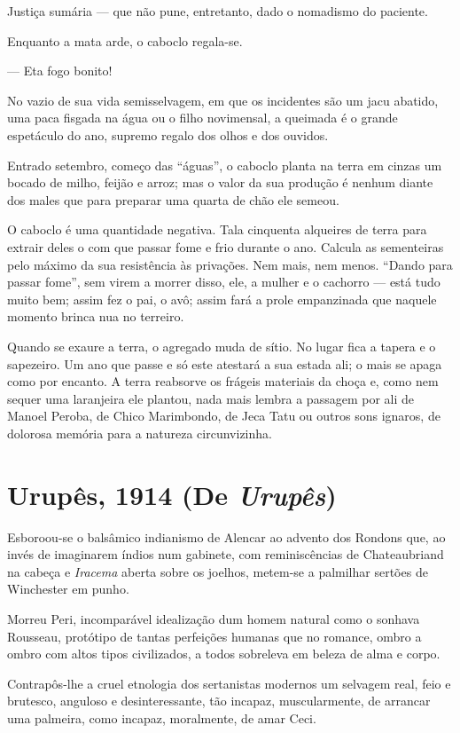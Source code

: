 Justiça sumária --- que não pune, entretanto, dado o nomadismo do
paciente.

Enquanto a mata arde, o caboclo regala-se.

--- Eta fogo bonito!

No vazio de sua vida semisselvagem, em que os incidentes são um jacu
abatido, uma paca fisgada na água ou o filho novimensal, a queimada é o
grande espetáculo do ano, supremo regalo dos olhos e dos ouvidos.

Entrado setembro, começo das ``águas'', o caboclo planta na terra em
cinzas um bocado de milho, feijão e arroz; mas o valor da sua produção é
nenhum diante dos males que para preparar uma quarta de chão ele semeou.

O caboclo é uma quantidade negativa. Tala cinquenta alqueires de terra
para extrair deles o com que passar fome e frio durante o ano. Calcula
as sementeiras pelo máximo da sua resistência às privações. Nem mais,
nem menos. ``Dando para passar fome'', sem virem a morrer disso, ele, a
mulher e o cachorro --- está tudo muito bem; assim fez o pai, o avô;
assim fará a prole empanzinada que naquele momento brinca nua no
terreiro.

Quando se exaure a terra, o agregado muda de sítio. No lugar fica a
tapera e o sapezeiro. Um ano que passe e só este atestará a sua estada
ali; o mais se apaga como por encanto. A terra reabsorve os frágeis
materiais da choça e, como nem sequer uma laranjeira ele plantou, nada
mais lembra a passagem por ali de Manoel Peroba, de Chico Marimbondo, de
Jeca Tatu ou outros sons ignaros, de dolorosa memória para a natureza
circunvizinha.

\chapter{Urupês, 1914 (De \emph{Urupês})}

Esboroou-se o balsâmico indianismo de Alencar ao advento dos Rondons
que, ao invés de imaginarem índios num gabinete, com reminiscências de
Chateaubriand na cabeça e \emph{Iracema} aberta sobre os joelhos,
metem-se a palmilhar sertões de Winchester em punho.

Morreu Peri, incomparável idealização dum homem natural como o sonhava
Rousseau, protótipo de tantas perfeições humanas que no romance, ombro a
ombro com altos tipos civilizados, a todos sobreleva em beleza de alma e
corpo.

Contrapôs-lhe a cruel etnologia dos sertanistas modernos um selvagem
real, feio e brutesco, anguloso e desinteressante, tão incapaz,
muscularmente, de arrancar uma palmeira, como incapaz, moralmente, de
amar Ceci.

